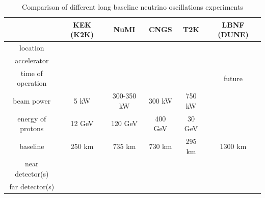 \begin{table}[h]
  \centering
  \begin{center}
  \caption{ Comparison of different long baseline neutrino oscillations experiments}
  \begin{tabular}{|c|c|c|c|c|c|}
              & KEK (K2K) & NuMI & CNGS & T2K & LBNF (DUNE)\\ \hline
     location &   &  &  &  & \\ \hline
     accelerator &   &  &  &  & \\ \hline
     time of operation &   &  &  &  & future \\ \hline 
     beam power  &  5 kW  & 300-350 kW  & 300 kW & 750 kW & \\ \hline 
     energy of protons  & 12 GeV & 120 GeV & 400 GeV & 30 GeV & \\ \hline 
     baseline  & 250 km & 735 km & 730 km & 295 km & 1300 km\\ \hline 
     near detector(s)  &   &  &  &  & \\ \hline 
     far detector(s)  &   &  &  &  & \\ \hline 
 \end{tabular}
  \label{tab:LeptonFlavorNumber}
  \end{center}
\end{table}



